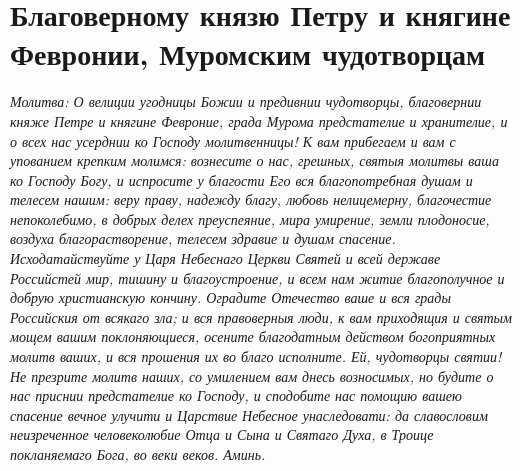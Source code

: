 \section{Благоверному князю Петру и княгине Февронии, Муромским чудотворцам}\begin{mymulticols}


\itshape Молитва:\normalfont{} О велиции угодницы Божии и предивнии чудотворцы, благовернии княже Петре и княгине Февроние, града Мурома предстателие и хранителие, и о всех нас усерднии ко Господу молитвенницы! К вам прибегаем и вам с упованием крепким молимся: вознесите о нас, грешных, святыя молитвы ваша ко Господу Богу, и испросите у благости Его вся благопотребная душам и телесем нашим: веру праву, надежду благу, любовь нелицемерну, благочестие непоколебимо, в добрых делех преуспеяние, мира умирение, земли плодоносие, воздуха благорастворение, телесем здравие и душам спасение. Исходатайствуйте у Царя Небеснаго Церкви Святей и всей державе Российстей мир, тишину и благоустроение, и всем нам житие благополучное и добрую христианскую кончину. Оградите Отечество ваше и вся грады Российския от всякаго зла; и вся правоверныя люди, к вам приходящия и святым мощем вашим поклоняющиеся, осените благодатным действом богоприятных молитв ваших, и вся прошения их во благо исполните. Ей, чудотворцы святии! Не презрите молитв наших, со умилением вам днесь возносимых, но будите о нас приснии предстателие ко Господу, и сподобите нас помощию вашею спасение вечное улучити и Царствие Небесное унаследовати: да славословим неизреченное человеколюбие Отца и Сына и Святаго Духа, в Троице покланяемаго Бога, во веки веков. Аминь.

\end{mymulticols}

\mychapterending





